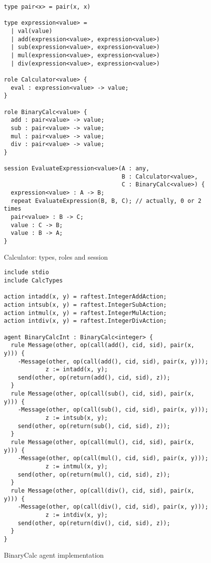 \documentclass[a4paper,12pt,oneside,fleqn]{book} %
\begin{document}
\begin{figure}\footnotesize %
\begin{verbatim}
type pair<x> = pair(x, x)

type expression<value> =
  | val(value)
  | add(expression<value>, expression<value>)
  | sub(expression<value>, expression<value>)
  | mul(expression<value>, expression<value>)
  | div(expression<value>, expression<value>)

role Calculator<value> {
  eval : expression<value> -> value;
}

role BinaryCalc<value> {
  add : pair<value> -> value;
  sub : pair<value> -> value;
  mul : pair<value> -> value;
  div : pair<value> -> value;
}

session EvaluateExpression<value>(A : any,
                                  B : Calculator<value>,
                                  C : BinaryCalc<value>) {
  expression<value> : A -> B;
  repeat EvaluateExpression(B, B, C); // actually, 0 or 2 times
  pair<value> : B -> C;
  value : C -> B;
  value : B -> A;
}
\end{verbatim}
\caption{Calculator: types, roles and session}
\label{fig:calc-roles}
\end{figure} %

\begin{figure}\footnotesize %
\begin{verbatim}
include stdio
include CalcTypes

action intadd(x, y) = raftest.IntegerAddAction;
action intsub(x, y) = raftest.IntegerSubAction;
action intmul(x, y) = raftest.IntegerMulAction;
action intdiv(x, y) = raftest.IntegerDivAction;

agent BinaryCalcInt : BinaryCalc<integer> {
  rule Message(other, op(call(add(), cid, sid), pair(x, y))) {
    -Message(other, op(call(add(), cid, sid), pair(x, y)));
            z := intadd(x, y);
    send(other, op(return(add(), cid, sid), z));
  }
  rule Message(other, op(call(sub(), cid, sid), pair(x, y))) {
    -Message(other, op(call(sub(), cid, sid), pair(x, y)));
            z := intsub(x, y);
    send(other, op(return(sub(), cid, sid), z));
  }
  rule Message(other, op(call(mul(), cid, sid), pair(x, y))) {
    -Message(other, op(call(mul(), cid, sid), pair(x, y)));
            z := intmul(x, y);
    send(other, op(return(mul(), cid, sid), z));
  }
  rule Message(other, op(call(div(), cid, sid), pair(x, y))) {
    -Message(other, op(call(div(), cid, sid), pair(x, y)));
            z := intdiv(x, y);
    send(other, op(return(div(), cid, sid), z));
  }
}
\end{verbatim}
\caption{BinaryCalc agent implementation}
\label{fig:bcalc-rules}
\end{figure} %
\end{document}
